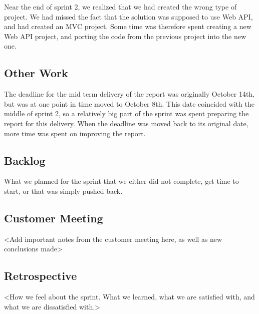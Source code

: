 Near the end of sprint 2, we realized that we had created the wrong type of project. We had missed the fact that the solution was supposed to use Web API, and had created an MVC project. Some time was therefore spent creating a new Web API project, and porting the code from the previous project into the new one.

\subsection{Other Work}
The deadline for the mid term delivery of the report was originally October 14th, but was at one point in time moved to October 8th. This date coincided with the middle of sprint 2, so a relatively big part of the sprint was spent preparing the report for this delivery. When the deadline was moved back to its original date, more time was spent on improving the report.

\subsection{Backlog}
What we planned for the sprint that we either did not complete, get time to start, or that was simply pushed back.

\subsection{Customer Meeting}
<Add important notes from the customer meeting here, as well as new conclusions made>

\subsection{Retrospective}
<How we feel about the sprint. What we learned, what we are satisfied with, and what we are dissatisfied with.>